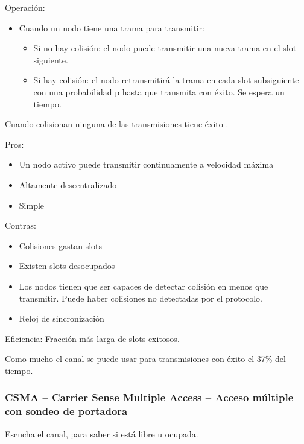 \documentclass[12pt, twoside, openright]{report} %
\begin{document}
Operación:

\begin{itemize}
	\item Cuando un nodo tiene una trama para transmitir:

	      \begin{itemize}
		      \item Si no hay colisión: el nodo puede transmitir una nueva
		            trama en el slot siguiente.
		      \item Si hay colisión: el nodo retransmitirá la trama en cada
		            slot subsiguiente con una probabilidad p hasta que
		            transmita con éxito. Se espera un tiempo.
	      \end{itemize}
\end{itemize}

Cuando colisionan ninguna de las transmisiones tiene éxito .

Pros:

\begin{itemize}
	\item Un nodo activo puede transmitir continuamente a velocidad
	      máxima
	\item Altamente descentralizado
	\item Simple
\end{itemize}

Contras:

\begin{itemize}
	\item Colisiones gastan slots
	\item Existen slots desocupados
	\item Los nodos tienen que ser capaces de detectar colisión en
	      menos que transmitir. Puede haber colisiones no detectadas
	      por el protocolo.
	\item Reloj de sincronización
\end{itemize}

Eficiencia: Fracción más larga de slots exitosos.

Como mucho el canal se puede usar para transmisiones con éxito
el 37\% del tiempo.


\subsubsection{CSMA -- Carrier Sense Multiple Access -- Acceso múltiple con
	sondeo de portadora}

Escucha el canal, para saber si está libre u ocupada.
\end{document}
